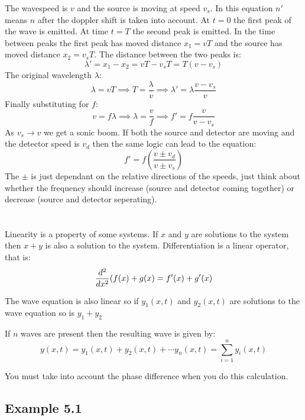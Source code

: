 The wavespeed is \(v\) and the source is moving at speed \(v_s\). In this equation \(n'\) means \(n\) after the doppler shift is taken into account. At \(t=0\) the first peak of the wave is emitted. At time \(t=T\) the second peak is emitted. In the time between peaks the first peak has moved distance \(x_1=vT\) and the source has moved distance \(x_2=v_sT\). The distance between the two peaks is:
\[\lambda'=x_1-x_2=vT-v_sT=T(v-v_s)\]
The original wavelength \(\lambda\):
\[\lambda=vT\implies T=\frac{\lambda}{v}\implies\lambda'=\lambda\frac{v-v_s}{v}\]
Finally substituting for \(f\):
\[v=f\lambda\implies\lambda=\frac vf\implies f'=f\frac{v}{v-v_s}\]
As \(v_s\to v\) we get a sonic boom. If both the source and detector are moving and the detector speed is \(v_d\) then the same logic can lead to the equation:
\[f'=f\left(\frac{v\pm v_d}{v\pm v_s}\right)\]
The \(\pm\) is just dependant on the relative directions of the speeds, just think about whether the frequency should increase (source and detector coming together) or decrease (source and detector seperating).
 
\section{}

Linearity is a property of some systems. If \(x\) and \(y\) are solutions to the system then \(x+y\) is also a solution to the system. Differentiation is a linear operator, that is:
\[\diff[2] x(f(x)+g(x)=f'(x)+g'(x)\]

The wave equation is also linear so if \(y_1(x,t)\) and \(y_2(x,t)\) are solutions to the wave equation so is \(y_1+y_2\)

If \(n\) waves are present then the resulting wave is given by:
\[y(x,t)=y_1(x,t)+y_2(x,t)+\cdots y_n(x,t)=\sum_{i=1}^ny_i(x,t)\]

You must take into account the phase difference when you do this calculation.

\subsection*{Example 5.1}

